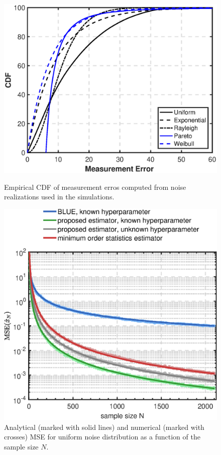 \documentclass{article}
\begin{document}
\begin{figure}[t]
\begin{minipage}[t]{0.47\linewidth}
		\includegraphics[width=1.14\linewidth]{cdf_error}
		\caption{Empirical CDF of measurement erros computed from noise realizations used in the simulations.}
		\label{fig:cdf_error}
	\end{minipage}%
	\hfill%
	\begin{minipage}[t]{0.47\linewidth}
		\includegraphics[width=\linewidth]{estimationMse_unif}
		\caption{Analytical (marked with solid lines) and numerical (marked with crosses) MSE for uniform noise distribution as a function of the sample size $N$.}		
		\label{fig:uniform_blue_mvu}
	\end{minipage} 
\end{figure}
\end{document}
